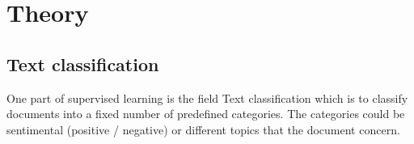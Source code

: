 

\section{Theory}

\subsection{Text classification}
One part of supervised learning is the field Text classification which is to classify documents into a fixed number of predefined categories. The categories could be sentimental (positive / negative) or different topics that the document concern.

